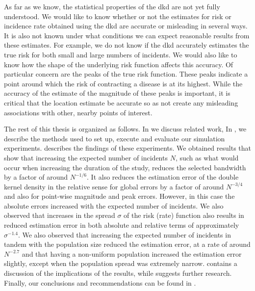 As far as we know,
the statistical properties of the \gls{dkd} are not yet fully understood.
We would like to know whether or not the estimates for \gls{risk} or \gls{incidence rate}
obtained using the \gls{dkd} are accurate or misleading in several ways.
It is also not known under what conditions we can expect reasonable results from these estimates.
For example,
we do not know if the \gls{dkd} accurately estimates the true \gls{risk}
for both small and large numbers of incidents.
We would also like to know how the shape of the underlying \gls{risk} function affects this accuracy.
Of particular concern are the peaks of the true risk function.
These peaks indicate a point around which the risk of contracting a disease is at its highest.
While the accuracy of the estimate of the magnitude of these peaks is important,
it is critical that the location estimate be accurate so as not create any misleading associations
with other, nearby points of interest.

The rest of this thesis is organized as follows.
In  we discuss related work,
In , we describe the methods used to set up, execute and evaluate our simulation experiments.
 describes the findings of these experiments.
We obtained results that show that increasing the expected number of incidents $N$,
such as what would occur when increasing the duration of the study,
reduces the selected bandwidth by a factor of around $N^{-1/6}$.
It also reduces the estimation error of the double kernel density in the relative sense
for global errors by a factor of around $N^{-3/4}$ and also for point-wise magnitude and peak errors.
However, in this case the absolute errors increased with the expected number of incidents.
We also observed that increases in the spread $\sigma$ of the risk (rate) function also results in reduced estimation error
in both absolute and relative terms of approximately $\sigma^{-1.4}$.
We also observed that increasing the expected number of incidents in tandem with the population size reduced the estimation error,
at a rate of around $N^{-2.7}$
and that having a non-uniform population increased the estimation error slightly, 
except when the population spread was extremely narrow.
 contains a discussion of the implications of the results,
while  suggests further research.
Finally, our conclusions and recommendations can be found in .

